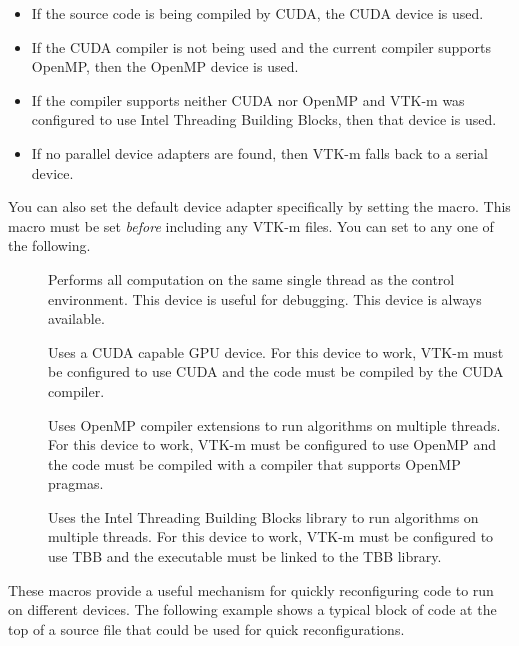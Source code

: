 \begin{itemize}
\item {} If the source code is being compiled by CUDA, the CUDA
  device is used.
\item {} If the CUDA compiler is not being used and the current
  compiler supports OpenMP, then the OpenMP device is used.
\item {}  If the compiler
  supports neither CUDA nor OpenMP and VTK-m was configured to use Intel
  Threading Building Blocks, then that device is used.
\item {} If no parallel device adapters are found, then VTK-m
  falls back to a serial device.
\end{itemize}

You can also set the default device adapter specifically by setting the
 macro. This macro must be set
\emph{before} including any VTK-m files. You can set
 to any one of the following.

\begin{description}
\item[] Performs all computation on
  the same single thread as the control environment. This device is useful
  for debugging. This device is always available.
\item[] Uses a CUDA capable GPU
  device. For this device to work, VTK-m must be configured to use CUDA and
  the code must be compiled by the CUDA  compiler.
\item[] Uses OpenMP compiler
  extensions to run algorithms on multiple threads. For this device to
  work, VTK-m must be configured to use OpenMP and the code must be
  compiled with a compiler that supports OpenMP pragmas.
\item[] Uses the Intel Threading
  Building Blocks library to run algorithms on multiple threads. For this
  device to work, VTK-m must be configured to use TBB and the executable
  must be linked to the TBB library.
\end{description}

These macros provide a useful mechanism for quickly reconfiguring code to
run on different devices. The following example shows a typical block of
code at the top of a source file that could be used for quick
reconfigurations.

